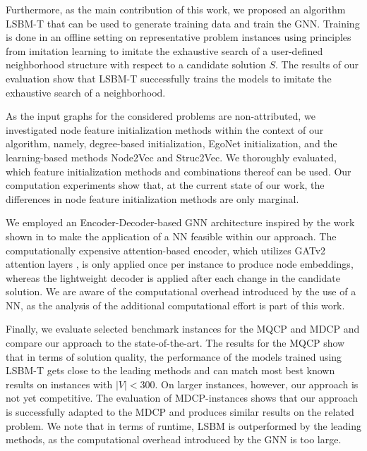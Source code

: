 \documentclass[draft,final]{vutinfth} %
\begin{document}
Furthermore, as the main contribution of this work, we proposed an algorithm LSBM-T that can be used to generate training data and train the GNN. Training is done in an offline setting on representative problem instances using principles from imitation learning to imitate the exhaustive search of a user-defined neighborhood structure with respect to a candidate solution $S$. The results of our evaluation show that LSBM-T successfully trains the models to imitate the exhaustive search of a neighborhood. 

As the input graphs for the considered problems are non-attributed, we investigated node feature initialization methods within the context of our algorithm, namely, degree-based initialization, EgoNet initialization, and the learning-based methods Node2Vec and Struc2Vec. 
We thoroughly evaluated, which feature initialization methods and combinations thereof can be used. Our computation experiments show that, at the current state of our work, the differences in node feature initialization methods are only marginal. 

We employed an Encoder-Decoder-based GNN architecture inspired by the work shown in \cite{Kool2019} to make the application of a NN feasible within our approach. The computationally expensive attention-based encoder, which utilizes GATv2 attention layers \cite{Brody2021}, is only applied once per instance to produce node embeddings, whereas the lightweight decoder is applied after each change in the candidate solution. 
We are aware of the computational overhead introduced by the use of a NN, as the analysis of the additional computational effort is part of this work. 

Finally, we evaluate selected benchmark instances for the MQCP and MDCP and compare our approach to the state-of-the-art. The results for the MQCP show that 
in terms of solution quality, the performance of the models trained using LSBM-T gets close to the leading methods and can match most best known results on instances with $|V| < 300$. On larger instances, however, our approach is not yet competitive. 
The evaluation of MDCP-instances shows that our approach is successfully adapted to the MDCP and produces similar results on the related problem. 
We note that in terms of runtime, LSBM is outperformed by the leading methods, as the computational overhead introduced by the GNN is too large. 


\end{document}
